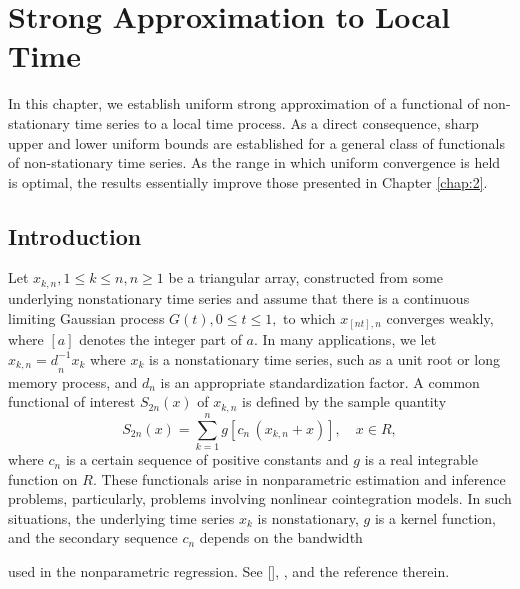 \chapter{Strong Approximation to Local Time} 
\ifpdf
    \graphicspath{{Chapter3/Chapter3Figs/PNG/}{Chapter3/Chapter3Figs/PDF/}{Chapter3/Chapter3Figs/}}
\else
    \graphicspath{{Chapter3/Chapter3Figs/EPS/}{Chapter3/Chapter3Figs/}}
\fi

In this chapter, we establish uniform strong approximation of a functional of non-stationary time series to a local time process. As a direct consequence, sharp upper and lower uniform bounds are established for a general class of functionals of non-stationary time series. As the range in which uniform convergence is held is optimal, the results essentially improve those presented in Chapter \ref{chap:2}.

\section{Introduction}
Let ${x_{k,n},1\leq k\leq n,n\geq 1}$
 be  a triangular  array, constructed from some
underlying nonstationary time series and assume that there is a continuous
limiting Gaussian process $G(t),0\leq t\leq 1,$ to which $x_{[nt],n}$
converges weakly, where $[a]$ denotes the integer part of $a.$ In many applications, we let ${x_{k,n}=d}_{n}^{-1}{x}%
_{k}$ where $x_{k}$ is a nonstationary time series, such as a unit root or
long memory process, and $d_{n}$ is an appropriate standardization
factor. A common functional of interest $S_{2n}(x)$ of $x_{k,n}$ is defined by
the sample quantity%
\begin{equation}
S_{2n} (x)=\sum_{k=1}^{n}g[c_{n}\,(x_{k,n}+x)], \quad x\in R,
\end{equation}
where $c_{n}$ is a certain sequence of positive constants and $g$ is a real
integrable function on $R$. These functionals arise in nonparametric
estimation and inference  problems, particularly, problems involving nonlinear cointegration
models. In such situations, the underlying time series $x_{k}$ is nonstationary, $g$ is a
kernel function, and the secondary sequence $c_{n}$ depends on the bandwidth

used in the nonparametric regression. See [\citet[][\citeyear{parkphillips2001}]{parkphillips1999}],
\cite{karlsenmyklebusttjostheim2007}, \citet[][\citeyear{wangphillips2010a}, \citeyear{wangphillips2010b}, \citeyear{wangphillips2012}]{wangphillips2009} and the reference therein.

